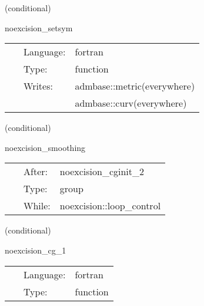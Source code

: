 \vspace{5mm}

   (conditional) 

\hspace{5mm} noexcision\_setsym 

\hspace{5mm}{\it register the symmetries for the conjugate gradient functions. } 


\hspace{5mm}

 \begin{tabular*}{160mm}{cll} 
~ & Language:  & fortran \\ 
~ & Type:  & function \\ 
~ & Writes:  & admbase::metric(everywhere) \\ 
~& ~ &admbase::curv(everywhere)\\ 
\end{tabular*} 


\vspace{5mm}

   (conditional) 

\hspace{5mm} noexcision\_smoothing 

\hspace{5mm}{\it smooth regions } 


\hspace{5mm}

 \begin{tabular*}{160mm}{cll} 
~ & After:  & noexcision\_cginit\_2 \\ 
~ & Type:  & group \\ 
~ & While:  & noexcision::loop\_control \\ 
\end{tabular*} 


\vspace{5mm}

   (conditional) 

\hspace{5mm} noexcision\_cg\_1 

\hspace{5mm}{\it conjugate gradients step 1 } 


\hspace{5mm}

 \begin{tabular*}{160mm}{cll} 
~ & Language:  & fortran \\ 
~ & Type:  & function \\ 
\end{tabular*} 


